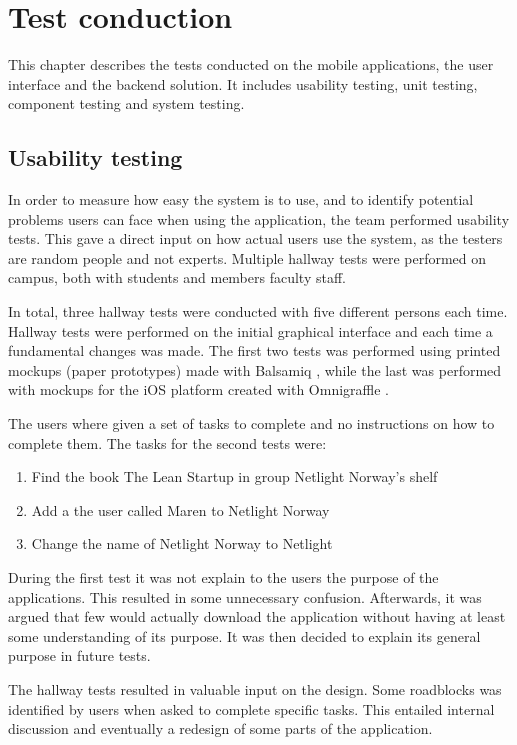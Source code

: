 \chapter{Test conduction}
\label{test-conduction}
This chapter describes the tests conducted on the mobile applications, the user interface and the \gls{backend} solution. It includes usability testing, unit testing, component testing and system testing. 
\section{Usability testing}
In order to measure how easy the system is to use, and to identify potential problems users can face when using the application, the team performed usability tests. This gave a direct input on how actual users use the system, as the testers are random people and not experts. Multiple hallway tests were performed on campus, both with students and members faculty staff. 

In total, three hallway tests were conducted with five different persons each time. Hallway tests were performed on the initial graphical interface and each time a fundamental changes was made. The first two tests was performed using printed \gls{mockup}s (paper prototypes) made with Balsamiq \cite{balsamiq}, while the last was performed with \gls{mockup}s for the iOS platform created with Omnigraffle \cite{omnigraffle}. 

The users where given a set of tasks to complete and no instructions on how to complete them. The tasks for the second tests were: 
\begin{enumerate}
    \item Find the book The Lean Startup in group Netlight Norway’s shelf
    \item Add a the user called Maren to Netlight Norway
    \item Change the name of Netlight Norway to Netlight
\end{enumerate}
During the first test it was not explain to the users the purpose of the applications. This resulted in some unnecessary confusion. Afterwards, it was argued that few would actually download the application without having at least some understanding of its purpose. It was then decided to explain its general purpose in future tests.

The hallway tests resulted in valuable input on the design. Some roadblocks  was identified by users when asked to complete specific tasks. This entailed  internal discussion and eventually a redesign of some parts of the application.

